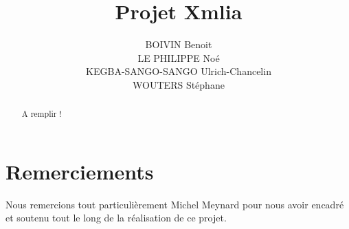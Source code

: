 \documentclass [a4 paper,11pt]{report}
\title {Projet Xmlia}
\author {
BOIVIN Benoit\\
LE PHILIPPE Noé\\
KEGBA-SANGO-SANGO Ulrich-Chancelin\\
WOUTERS Stéphane
}
\begin{document}
\maketitle

\begin{abstract}
A remplir !
\end{abstract}

\chapter*{Remerciements}
Nous remercions tout particulièrement Michel Meynard pour nous avoir encadré et soutenu tout le long de la réalisation de ce projet.

\tableofcontents









\appendix
\end{document}
